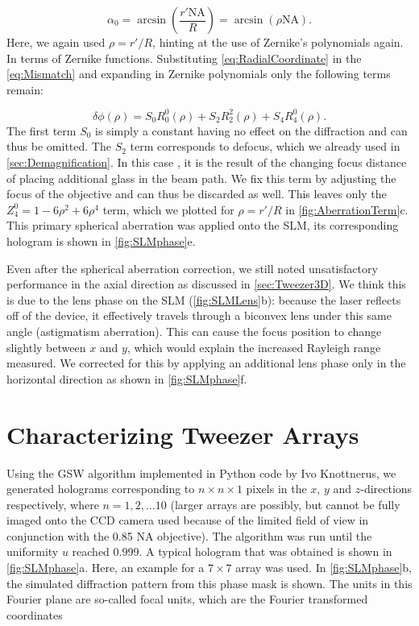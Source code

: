 \begin{equation}\label{eq:RadialCoordinate}
    \alpha_0 = \operatorname{arcsin}\left(\frac{r'\text{NA}}{R}\right)
    =\operatorname{arcsin}\left(\rho \text{NA}\right).
\end{equation}
Here, we again used $\rho=r'/R$, hinting at the use of Zernike's polynomials again.
In terms of Zernike functions.
Substituting \cref{eq:RadialCoordinate} in the \cref{eq:Mismatch} and expanding in Zernike polynomials only the following terms remain:

\begin{equation}
    \delta \phi(\rho) = S_0 R_0^0(\rho) + S_2 R_2^2(\rho) + S_4 R_4^0(\rho).
\end{equation}
The first term $S_0$ is simply a constant having no effect on the diffraction and can thus be omitted. 
The $S_2$ term corresponds to defocus, which we already used in \cref{sec:Demagnification}.
In this case , it is the result of the changing focus distance of placing additional glass in the beam path.
We fix this term by adjusting the focus of the objective and can thus be discarded as well.
This leaves only the $Z_4^0 = 1 - 6 \rho^2 + 6 \rho^4$ term, which we plotted for $\rho=r'/R$ in \cref{fig:AberrationTerm}c.
This primary spherical aberration was applied onto the SLM, its corresponding hologram is shown in \cref{fig:SLMphase}e.


Even after the spherical aberration correction, we still noted unsatisfactory performance in the axial direction as discussed in \cref{sec:Tweezer3D}. 
We think this is due to the lens phase on the SLM (\cref{fig:SLMLens}b): because the laser reflects off of the device, it effectively travels through a biconvex lens under this same angle (astigmatism aberration). 
This can cause the focus position to change slightly between $x$ and $y$, which would explain the increased Rayleigh range measured. 
We corrected for this by applying an additional lens phase only in the horizontal direction as shown in \cref{fig:SLMphase}f.


\section{Characterizing Tweezer Arrays}\label{sec:ArraysResults}

Using the \ac{GSW} algorithm implemented in Python code by Ivo Knottnerus, we generated holograms corresponding to $n \times n \times 1$ pixels in the $x$, $y$ and $z$-directions respectively, where $n = 1,2,\ldots 10$ (larger arrays are possibly, but cannot be fully imaged onto the CCD camera used because of the limited field of view in conjunction with the 0.85 NA objective). 
The algorithm was run until the uniformity $u$ reached 0.999. 
A typical hologram that was obtained is shown in \cref{fig:SLMphase}a.
Here, an example for a $7 \times 7$ array was used. 
In \cref{fig:SLMphase}b, the simulated diffraction pattern from this phase mask is shown. 
The units in this Fourier plane are so-called focal units, which are the Fourier transformed coordinates \cite{Bijnen2015}



